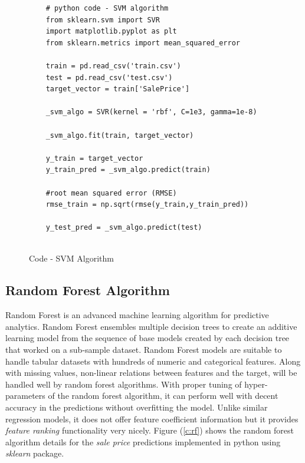 \documentclass[sigconf]{acmart}
\begin{document}
	\begin{figure}[htb]	
	\begin{verbatim}	
	# python code - SVM algorithm
	from sklearn.svm import SVR
	import matplotlib.pyplot as plt
	from sklearn.metrics import mean_squared_error
	
	train = pd.read_csv('train.csv')
	test = pd.read_csv('test.csv')
	target_vector = train['SalePrice']
	
	_svm_algo = SVR(kernel = 'rbf', C=1e3, gamma=1e-8)	
	
	_svm_algo.fit(train, target_vector)    
		
	y_train = target_vector
	y_train_pred = _svm_algo.predict(train)
	
	#root mean squared error (RMSE)
	rmse_train = np.sqrt(rmse(y_train,y_train_pred))
	
	y_test_pred = _svm_algo.predict(test)
	
	\end{verbatim}
	\caption{Code - SVM Algorithm} \label{c:svm} 
	\end{figure}
	

	\subsection{Random Forest Algorithm}

    Random Forest is an advanced machine learning algorithm for predictive analytics. Random Forest ensembles multiple decision trees to create an additive learning model from the sequence of base models created by each decision tree that worked on a sub-sample dataset. Random Forest models are suitable to handle tabular datasets with hundreds of numeric and categorical features. Along with missing values, non-linear relations between features and the target, will be handled well by random forest algorithms. With proper tuning of hyper-parameters of the random forest algorithm, it can perform well with decent accuracy in the predictions without overfitting the model. Unlike similar regression models, it does not offer feature coefficient information but it provides {\em feature ranking} functionality very nicely. Figure (\ref{c:rf}) shows the random forest algorithm details for the {\em sale price} predictions implemented in python using {\em sklearn} package.
	
\end{document}
